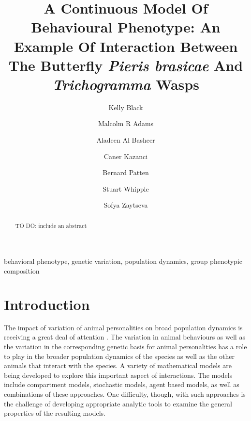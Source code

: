 \documentclass[review]{elsarticle}
\begin{document}
\begin{frontmatter}

\title{A Continuous Model Of Behavioural Phenotype: An Example Of
  Interaction Between The Butterfly \textit{Pieris brasicae} And
  \textit{Trichogramma} Wasps}

\author[math]{Kelly Black}\author[math]{Malcolm R Adams}\author[math]{Aladeen Al Basheer}\author[math,engineering]{Caner Kazanci}\author[odum]{Bernard Patten}\author[odum]{Stuart Whipple}\author[math]{Sofya Zaytseva}

\address[math]{Department of Mathematics, University of Georgia, Athens, GA 30602, USA}
\address[engineering]{College of Engineering, University of Georgia, Athens, GA 30602, USA}
\address[odum]{Odum School of Ecology and College of Engineering, University of Georgia, Athens, GA 30602, USA}



\begin{abstract}
TO DO: include an abstract
\end{abstract}

\begin{keyword}
behavioral phenotype, genetic variation, population dynamics, group phenotypic composition
\end{keyword}

\end{frontmatter}

\linenumbers


\section{Introduction}

The impact of variation of animal personalities on broad population
dynamics is receiving a great deal of
attention \cite{doi:10.1111/j.1461-0248.2010.01536.x}.  The variation
in animal behaviours as well as the variation in the corresponding
genetic basis for animal personalities has a role to play in the
broader population dynamics of the species as well as the other
animals that interact with the species. A variety of mathematical
models are being developed to explore this important aspect of
interactions. The models include compartment models, stochastic
models, agent based models, as well as combinations of these
approaches. One difficulty, though, with such approaches is the
challenge of developing appropriate analytic tools to examine the
general properties of the resulting models.
\end{document}
